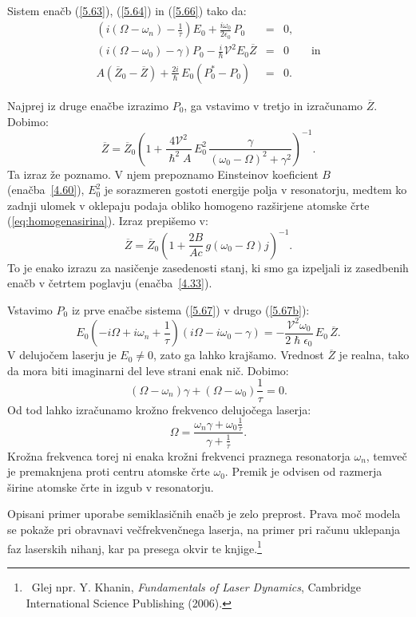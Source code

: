 Sistem enačb (\ref{5.63}), (\ref{5.64}) in (\ref{5.66}) 
tako da:
\begin{eqnarray}
\left(i\left(\Omega - \omega_n\right)-\frac{1}{\tau}\right) E_{0}+\frac{i\omega _{0}}
{2\epsilon _{0}}\,P_{0} &=&0,  \label{5.67} \\
\left(i\left(\Omega-\omega_{0}\right)-\gamma\right)P_{0}-\frac{i}{\hslash}\mathcal{V}^{2}
E_{0}\overline{Z} &=&0 \qquad \mathrm{in}\label{5.67b}\\
A\left(\overline{Z}_{0}-\overline{Z}\right)+\frac{2i}{\hslash }\,E_{0}\left(P_{0}^{*}-P_{0}\right) &=&0.
\end{eqnarray}

Najprej iz druge enačbe izrazimo $P_0$, ga vstavimo v tretjo in izračunamo $\overline{Z}$. Dobimo:
\begin{equation}  
\label{5.68}
\overline{Z}=\overline{Z}_0\left(1+\frac{4\mathcal{V}^2}{\hslash^2 A}\,E_0^2\, \frac{\gamma}
{\left(\omega_0-\Omega\right)^2+\gamma^2}\right)^{-1}\!\!.
\end{equation}
Ta izraz že poznamo. V njem prepoznamo Einsteinov
koeficient $B$ (enačba~\ref{4.60}),
$E_0^2$ je sorazmeren gostoti energije polja v resonatorju, medtem ko 
zadnji ulomek v oklepaju podaja obliko homogeno razširjene atomske
črte (\ref{eq:homogenasirina}). Izraz prepišemo v:
\begin{equation}  
\label{5.69}
\overline{Z}=\overline{Z}_0\left(1+\frac{2B}{Ac}\,g\left(\omega_0- \Omega\right)j\right)^{-1}\!\!.
\end{equation}
To je enako izrazu za nasičenje zasedenosti stanj, ki smo ga
izpeljali iz zasedbenih enačb v četrtem poglavju (enačba~\ref{4.33}).

Vstavimo $P_0$ iz prve enačbe sistema (\ref{5.67}) v drugo (\ref{5.67b}):
\begin{equation}  
\label{5.70}
E_0\left(-i\Omega+i\omega_n+\frac{1}{\tau}\right) \left(i\Omega- i\omega_0
-\gamma\right)=-\frac{\mathcal{V}^2 \omega_0}{2\hslash\epsilon_0}\,E_0\,\overline{Z}.
\end{equation}
V delujočem laserju je $E_0\ne 0$, zato ga lahko krajšamo. Vrednost $\overline{Z}$ je
realna, tako da mora biti imaginarni del leve strani enak nič. Dobimo:
\begin{equation}  
\label{5.71}
\left(\Omega- \omega_n\right)\gamma+\left(\Omega- \omega_0\right)\frac{1}{\tau} = 0.
\end{equation}
Od tod lahko izračunamo krožno frekvenco delujočega laserja:
\begin{equation}  \label{5.72}
\Omega=\frac{\omega_n\gamma+ \omega_0\frac{1}{\tau}}{\gamma + \frac{1}{\tau}}.
\end{equation}
Krožna frekvenca torej ni enaka krožni frekvenci praznega resonatorja $\omega_n$,
temveč je premaknjena proti centru atomske črte $\omega_0$. Premik je
odvisen od razmerja širine atomske črte in izgub v resonatorju.

Opisani primer uporabe semiklasičnih enačb je zelo preprost. Prava moč
modela se pokaže pri obravnavi večfrekvenčnega laserja, na primer pri
računu uklepanja faz laserskih nihanj, kar pa presega okvir te 
knjige.\footnote{~Glej npr. Y. Khanin, {\it Fundamentals of Laser Dynamics}, Cambridge International Science
Publishing (2006).} 
